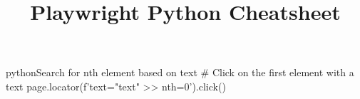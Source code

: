 \documentclass[10pt,a4paper]{article}
\title{\color{w3schools}Playwright Python Cheatsheet
}
\begin{document}
\maketitle

\small
\begin{multicols}{3}

\thispagestyle{empty}
\scriptsize



\begin{codebox}{python}{Search for nth element based on text}
# Click on the first element with a text
page.locator(f'text="{text}" >> nth=0').click()

\end{codebox}


\AtNextBibliography{\footnotesize}
\printbibliography  
\end{multicols}
\end{document}
